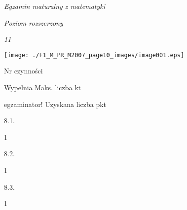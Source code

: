 \documentclass[a4paper,12pt]{article}
\begin{document}
{\it Egzamin maturalny z matematyki}

{\it Poziom rozszerzony}

{\it 11}
\begin{center}
\texttt{[image: ./F1\_M\_PR\_M2007\_page10\_images/image001.eps]}
\end{center}
Nr czynności

Wypelnia Maks. liczba kt

egzaminator! Uzyskana liczba pkt

8.1.

1

8.2.

1

8.3.

1
\end{document}
